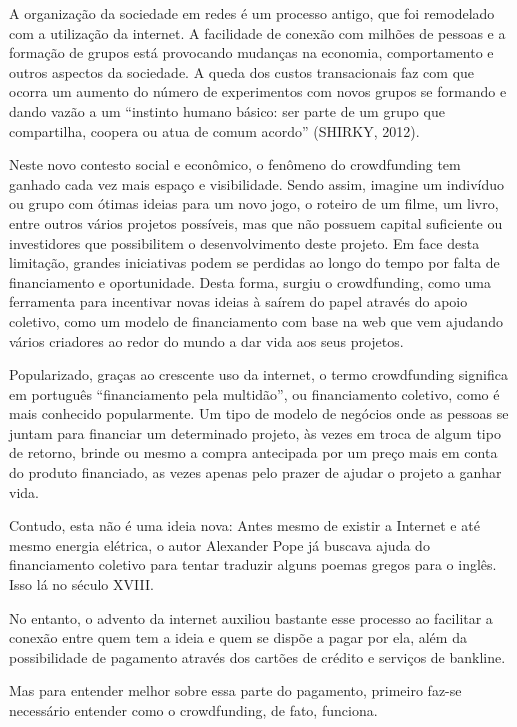 \documentclass{classe_cn}                 %
\begin{document}
A organização da sociedade em redes é um processo antigo, que foi remodelado com a utilização da internet. A facilidade de conexão com milhões de pessoas e a formação de grupos está provocando mudanças na economia, comportamento e outros aspectos da sociedade. A queda dos custos transacionais faz com que ocorra um aumento do número de experimentos com novos grupos se formando e dando vazão a um “instinto humano básico: ser parte de um grupo que compartilha, coopera ou atua de comum acordo” (SHIRKY, 2012).

Neste novo contesto social e econômico, o fenômeno do crowdfunding tem ganhado cada vez mais espaço e visibilidade. Sendo assim, imagine um indivíduo ou grupo com ótimas ideias para um novo jogo, o roteiro de um filme, um livro, entre outros vários projetos possíveis, mas que não possuem capital suficiente ou investidores que possibilitem o desenvolvimento deste projeto. Em face desta limitação, grandes iniciativas podem se perdidas ao longo do tempo por falta de financiamento e oportunidade. Desta forma, surgiu o crowdfunding, como uma ferramenta para incentivar novas ideias à saírem do papel através do apoio coletivo, como um modelo de financiamento com base na web que vem ajudando vários criadores ao redor do mundo a dar vida aos seus projetos.

Popularizado, graças ao crescente uso da internet, o termo crowdfunding significa em português “financiamento pela multidão”, ou financiamento coletivo, como é mais conhecido popularmente. Um tipo de modelo de negócios onde as pessoas se juntam para financiar um determinado projeto, às vezes em troca de algum tipo de retorno, brinde ou mesmo a compra antecipada por um preço mais em conta do produto financiado, as vezes apenas pelo prazer de ajudar o projeto a ganhar vida.

Contudo, esta não é uma ideia nova: Antes mesmo de existir a Internet e até mesmo energia elétrica, o autor Alexander Pope já buscava ajuda do financiamento coletivo para tentar traduzir alguns poemas gregos para o inglês. Isso lá no século XVIII.

No entanto, o advento da internet auxiliou bastante esse processo ao facilitar a conexão entre quem tem a ideia e quem se dispõe a pagar por ela, além da possibilidade de pagamento através dos cartões de crédito e serviços de bankline.

Mas para entender melhor sobre essa parte do pagamento, primeiro faz-se necessário entender como o crowdfunding, de fato, funciona.
\end{document}
